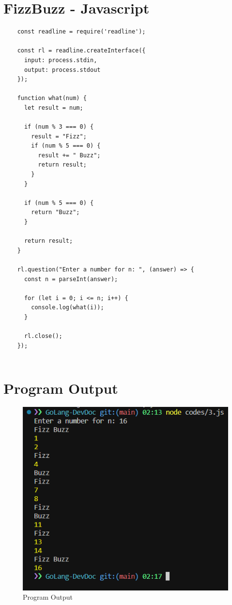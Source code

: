\documentclass{article}
\begin{document}
\section*{FizzBuzz - Javascript}
\begin{verbatim}
    const readline = require('readline');

    const rl = readline.createInterface({
      input: process.stdin,
      output: process.stdout
    });
    
    function what(num) {
      let result = num;
    
      if (num % 3 === 0) {
        result = "Fizz";
        if (num % 5 === 0) {
          result += " Buzz";
          return result;
        }
      }
    
      if (num % 5 === 0) {
        return "Buzz";
      }
    
      return result;
    }
    
    rl.question("Enter a number for n: ", (answer) => {
      const n = parseInt(answer);
    
      for (let i = 0; i <= n; i++) {
        console.log(what(i));
      }
    
      rl.close();
    });
    

\end{verbatim}

\newpage

\section*{Program Output}
\begin{figure}[h]
    \centering
    \includegraphics[width=1\textwidth]{./assets/fb.png}
    \caption{Program Output}
\end{figure}
\end{document}
